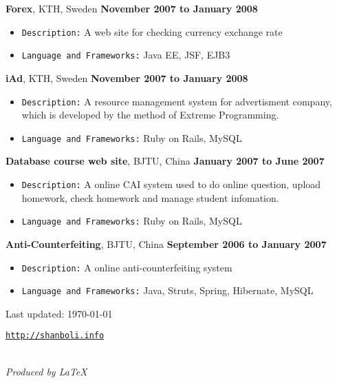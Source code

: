 \documentclass[11pt]{article}
\newenvironment{narrow}[2]{%
\begin{list}{}{%
\setlength{\topsep}{0pt}%
\setlength{\leftmargin}{#1}%
\setlength{\rightmargin}{#2}%
\setlength{\listparindent}{\parindent}%
\setlength{\itemindent}{\parindent}%
\setlength{\parsep}{\parskip}%
}%
\item[]}{\end{list}}
\newenvironment{outerlist}[1][\enskip\textbullet]%
        {\begin{itemize}[#1]}{\end{itemize}%
         \vspace{-.6\baselineskip}}
\newcommand{\blankline}{\quad\pagebreak[2]}
\begin{document}
\blankline

\textbf{Forex}, KTH, Sweden \hfill \textbf{November 2007 to January 2008}
\begin{outerlist}
\item \texttt{Description:}
A web site for checking currency exchange rate
\item \texttt{Language and Frameworks:}
Java EE, JSF, EJB3
\end{outerlist}

\blankline

\textbf{iAd}, KTH, Sweden \hfill \textbf{November 2007 to January 2008}
\begin{outerlist}
\item \texttt{Description:}
A resource management system for advertisment company, which is developed by the method of Extreme Programming.
\item \texttt{Language and Frameworks:}
Ruby on Rails, MySQL
\end{outerlist}

\blankline

\textbf{Database course web site}, BJTU, China \hfill \textbf{January 2007 to June 2007}
\begin{outerlist}
\item \texttt{Description:}
A online CAI system used to do online question, upload homework, check homework and manage student infomation.
\item \texttt{Language and Frameworks:}
Ruby on Rails, MySQL
\end{outerlist}

\blankline

\textbf{Anti-Counterfeiting}, BJTU, China \hfill \textbf{September 2006 to January 2007}
\begin{outerlist}
\item \texttt{Description:}
A online anti-counterfeiting system
\item \texttt{Language and Frameworks:}
Java, Struts, Spring, Hibernate, MySQL
\end{outerlist}



\vfill
\begin{narrow}{0.15in}{1.5in}
\begin{center}
\begin{footnotesize}
\begin{center}
Last updated: \today 
\end{center}
\href{http://shanboli.info}{\tt http://shanboli.info}
\end{footnotesize}\\
\vspace{0.2in}
\textit{Produced by \LaTeX}
\end{center}
\end{narrow}
\end{document}
